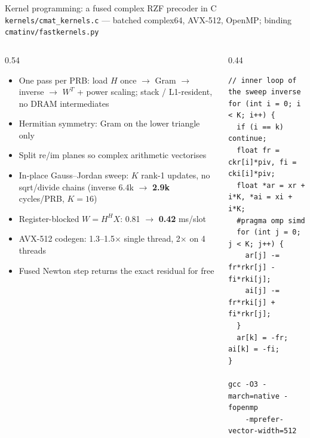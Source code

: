 \documentclass[aspectratio=169,11pt,xcolor=table]{beamer}
\newcommand{\gd}[1]{\textcolor{good}{\textbf{#1}}}
\begin{document}
\begin{frame}[fragile]{Kernel programming: a fused complex RZF precoder in C}
  \footnotesize \texttt{kernels/cmat\_kernels.c} --- batched complex64, AVX-512, OpenMP; binding \texttt{cmatinv/fastkernels.py}
  \begin{columns}[T]
    \begin{column}{0.54\textwidth}
      \begin{itemize}\footnotesize\setlength{\itemsep}{0pt}
        \item One pass per PRB: load $H$ once $\to$ Gram $\to$ inverse $\to$ $W^T$ + power scaling;
          stack / L1-resident, no DRAM intermediates
        \item Hermitian symmetry: Gram on the lower triangle only
        \item Split re/im planes so complex arithmetic vectorises
        \item In-place Gauss--Jordan sweep: $K$ rank-1 updates, no sqrt/divide chains
          (inverse 6.4k $\to$ \gd{2.9k} cycles/PRB, $K=16$)
        \item Register-blocked $W = H^H X$: 0.81 $\to$ \gd{0.42} ms/slot
        \item AVX-512 codegen: 1.3--1.5$\times$ single thread, 2$\times$ on 4 threads
        \item Fused Newton step returns the exact residual for free
      \end{itemize}
    \end{column}
    \begin{column}{0.44\textwidth}
\begin{lstlisting}
// inner loop of the sweep inverse
for (int i = 0; i < K; i++) {
  if (i == k) continue;
  float fr = ckr[i]*piv, fi = cki[i]*piv;
  float *ar = xr + i*K, *ai = xi + i*K;
  #pragma omp simd
  for (int j = 0; j < K; j++) {
    ar[j] -= fr*rkr[j] - fi*rki[j];
    ai[j] -= fr*rki[j] + fi*rkr[j];
  }
  ar[k] = -fr; ai[k] = -fi;
}

gcc -O3 -march=native -fopenmp
    -mprefer-vector-width=512
\end{lstlisting}
    \end{column}
  \end{columns}
\end{frame}
\end{document}
